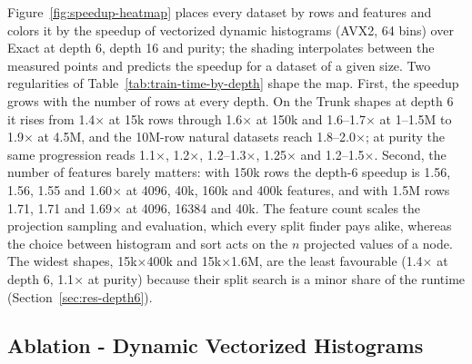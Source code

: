 \documentclass[sigconf,anonymous,review]{acmart}
\begin{document}
Figure~\ref{fig:speedup-heatmap} places every dataset by rows and features and colors it by the speedup of vectorized dynamic histograms (AVX2, 64 bins) over Exact at depth 6, depth 16 and purity; the shading interpolates between the measured points and predicts the speedup for a dataset of a given size. Two regularities of Table~\ref{tab:train-time-by-depth} shape the map. First, the speedup grows with the number of rows at every depth. On the Trunk shapes at depth 6 it rises from 1.4$\times$ at 15k rows through 1.6$\times$ at 150k and 1.6--1.7$\times$ at 1--1.5M to 1.9$\times$ at 4.5M, and the 10M-row natural datasets reach 1.8--2.0$\times$; at purity the same progression reads 1.1$\times$, 1.2$\times$, 1.2--1.3$\times$, 1.25$\times$ and 1.2--1.5$\times$. Second, the number of features barely matters: with 150k rows the depth-6 speedup is 1.56, 1.56, 1.55 and 1.60$\times$ at 4096, 40k, 160k and 400k features, and with 1.5M rows 1.71, 1.71 and 1.69$\times$ at 4096, 16384 and 40k. The feature count scales the projection sampling and evaluation, which every split finder pays alike, whereas the choice between histogram and sort acts on the $n$ projected values of a node. The widest shapes, 15k$\times$400k and 15k$\times$1.6M, are the least favourable (1.4$\times$ at depth 6, 1.1$\times$ at purity) because their split search is a minor share of the runtime (Section~\ref{sec:res-depth6}).





\subsection{Ablation - Dynamic Vectorized Histograms}
\label{sec:dyn}
\end{document}
